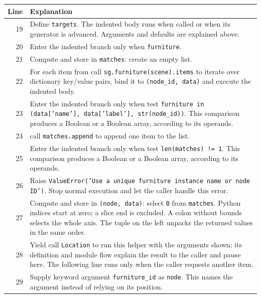 \documentclass[11pt,a4paper]{book}
\begin{document}
\begin{longtable}{r p{}}

\textbf{Line} & \textbf{Explanation} \\ \hline \endhead

19 & Define \texttt{targets}. The indented body runs when called or when its generator is advanced. Arguments and defaults are explained above. \\

20 & Enter the indented branch only when \texttt{furniture}. \\

21 & Compute and store in \texttt{matches}: create an empty list.  \\

22 & For each item from call \texttt{sg.furniture(scene).items} to iterate over dictionary key/value pairs, bind it to \texttt{(node\_id, data)} and execute the indented body. \\

23 & Enter the indented branch only when test \texttt{furniture in (data['name'], data['label'], str(node\_id))}. This comparison produces a Boolean or a Boolean array, according to its operands. \\

24 & call \texttt{matches.append} to append one item to the list. \\

25 & Enter the indented branch only when test \texttt{len(matches) != 1}. This comparison produces a Boolean or a Boolean array, according to its operands. \\

26 & Raise \texttt{ValueError('Use a unique furniture instance name or node ID')}. Stop normal execution and let the caller handle this error. \\

27 & Compute and store in \texttt{(node, data)}: select \texttt{0} from \texttt{matches}. Python indices start at zero; a slice end is excluded. A colon without bounds selects the whole axis. The tuple on the left unpacks the returned values in the same order. \\

28 & Yield call \texttt{Location} to run this helper with the arguments shown; its definition and module flow explain the result to the caller and pause here. The following line runs only when the caller requests another item. \\

29 & Supply keyword argument \texttt{furniture\_id} as \texttt{node}. This names the argument instead of relying on its position. \\


\end{longtable}
\end{document}
